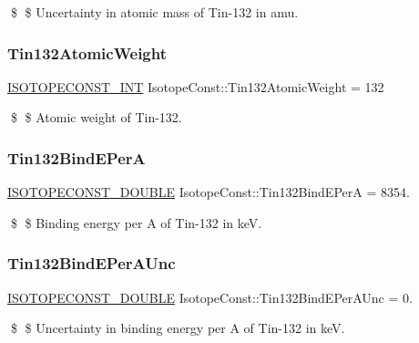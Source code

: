 \$ \$ Uncertainty in atomic mass of Tin-\/132 in amu. \mbox{\label{group___isotope_const-_tin-_sn132_ga8c4b295e4d3dcbf84abd3884231da1fd}} 
\subsubsection{\texorpdfstring{Tin132\+Atomic\+Weight}{Tin132AtomicWeight}}
{\footnotesize\ttfamily \mbox{\hyperlink{group___isotope_const-_macros_ga5f18360b3e99483a35c32d789e62621c}{I\+S\+O\+T\+O\+P\+E\+C\+O\+N\+S\+T\+\_\+\+I\+NT}} Isotope\+Const\+::\+Tin132\+Atomic\+Weight = 132}

\$ \$ Atomic weight of Tin-\/132. \mbox{\label{group___isotope_const-_tin-_sn132_ga65eecdb118d74f35161fda409bd47eaf}} 
\subsubsection{\texorpdfstring{Tin132\+Bind\+E\+PerA}{Tin132BindEPerA}}
{\footnotesize\ttfamily \mbox{\hyperlink{group___isotope_const-_macros_ga8f45a7272ce02c0b4c65c44636ed719a}{I\+S\+O\+T\+O\+P\+E\+C\+O\+N\+S\+T\+\_\+\+D\+O\+U\+B\+LE}} Isotope\+Const\+::\+Tin132\+Bind\+E\+PerA = 8354.}

\$ \$ Binding energy per A of Tin-\/132 in keV. \mbox{\label{group___isotope_const-_tin-_sn132_ga09c8a2bd94fbb36b6c10ae49a6870a34}} 
\subsubsection{\texorpdfstring{Tin132\+Bind\+E\+Per\+A\+Unc}{Tin132BindEPerAUnc}}
{\footnotesize\ttfamily \mbox{\hyperlink{group___isotope_const-_macros_ga8f45a7272ce02c0b4c65c44636ed719a}{I\+S\+O\+T\+O\+P\+E\+C\+O\+N\+S\+T\+\_\+\+D\+O\+U\+B\+LE}} Isotope\+Const\+::\+Tin132\+Bind\+E\+Per\+A\+Unc = 0.}

\$ \$ Uncertainty in binding energy per A of Tin-\/132 in keV. \mbox{\label{group___isotope_const-_tin-_sn132_gaa1c1d6d47c65ea5561176ebf9ddb5345}} 
